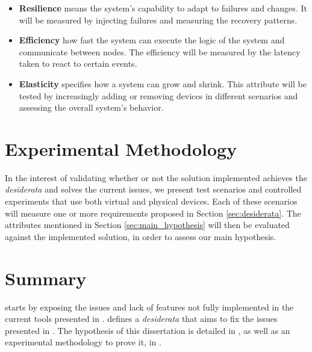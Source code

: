 \begin{itemize}
    \item \textbf{Resilience} means the system's capability to adapt to failures and changes. It will be measured by injecting failures and measuring the recovery patterns.
    \item \textbf{Efficiency} how fast the system can execute the logic of the system and communicate between nodes. The efficiency will be measured by the latency taken to react to certain events.
    \item \textbf{Elasticity} specifies how a system can grow and shrink. This attribute will be tested by increasingly adding or removing devices in different scenarios and assessing the overall system's behavior.
\end{itemize}

\section{Experimental Methodology}\label{sec:exp_meth}

In the interest of validating whether or not the solution implemented achieves the \emph{desiderata} and solves the current issues, we present test scenarios and controlled experiments that use both virtual and physical devices. Each of these scenarios will measure one or more requirements proposed in Section \ref{sec:desiderata}. The attributes mentioned in Section \ref{sec:main_hypothesis} will then be evaluated against the implemented solution, in order to assess our main hypothesis.

\section{Summary}\label{sec:stat_summary}

 starts by exposing the issues and lack of features not fully implemented in the current tools presented in .  defines a \textit{desiderata} that aims to fix the issues presented in . The hypothesis of this dissertation is detailed in , as well as an experimental methodology to prove it, in .

